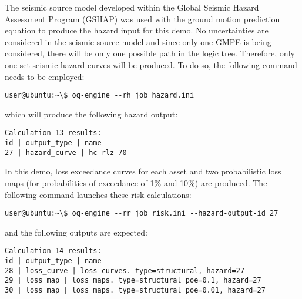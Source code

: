 The seismic source model developed within the Global Seismic Hazard Assessment
Program (GSHAP) was used with the \cite{chiou2008} ground motion prediction
equation to produce the hazard input for this demo. No uncertainties are
considered in the seismic source model and since only one GMPE is being
considered, there will be only one possible path in the logic tree. Therefore,
only one set seismic hazard curves will be produced. To do so, the following
command needs to be employed:

\begin{Verbatim}[frame=single, commandchars=\\\{\}, samepage=true]
user@ubuntu:~\$ oq-engine --rh job_hazard.ini
\end{Verbatim}

which will produce the following hazard output:

\begin{Verbatim}[frame=single, commandchars=\\\{\}, samepage=true]
Calculation 13 results:
id | output_type | name
27 | hazard_curve | hc-rlz-70
\end{Verbatim}

In this demo, loss exceedance curves for each asset and two probabilistic loss
maps (for probabilities of exceedance of 1\% and 10\%) are produced. The
following command launches these risk calculations:

\begin{Verbatim}[frame=single, commandchars=\\\{\}, samepage=true]
user@ubuntu:~\$ oq-engine --rr job_risk.ini --hazard-output-id 27
\end{Verbatim}

and the following outputs are expected:

\begin{Verbatim}[frame=single, commandchars=\\\{\}, samepage=true]
Calculation 14 results:
id | output_type | name
28 | loss_curve | loss curves. type=structural, hazard=27
29 | loss_map | loss maps. type=structural poe=0.1, hazard=27
30 | loss_map | loss maps. type=structural poe=0.01, hazard=27
\end{Verbatim}